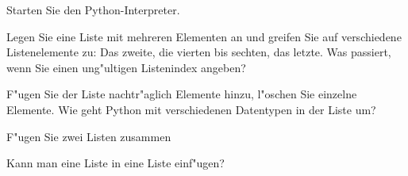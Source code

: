 \newpage
\begin{aufgabe}[Listen]
Starten Sie den Python-Interpreter.
\begin{auflistung}
\item Legen Sie eine Liste mit mehreren Elementen an und greifen Sie auf verschiedene Listenelemente zu: Das zweite, die vierten bis sechten, das letzte. Was passiert, wenn Sie einen ung"ultigen Listenindex angeben?
\item F"ugen Sie der Liste nachtr"aglich Elemente hinzu, l"oschen Sie einzelne Elemente. Wie geht Python mit verschiedenen Datentypen in der Liste um?
\item F"ugen Sie zwei Listen zusammen
\item Kann man eine Liste in eine Liste einf"ugen?
\end{auflistung}
\end{aufgabe}

